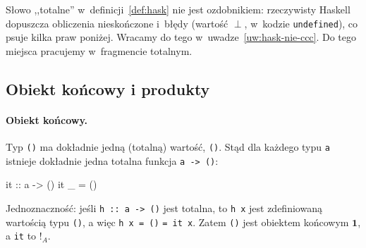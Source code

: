 Słowo ,,totalne'' w~definicji~\ref{def:hask} nie jest ozdobnikiem: rzeczywisty Haskell dopuszcza obliczenia nieskończone i~błędy (wartość $\perp$, w~kodzie \lstinline{undefined}), co psuje kilka praw poniżej. Wracamy do tego w~uwadze~\ref{uw:hask-nie-ccc}. Do tego miejsca pracujemy w~fragmencie totalnym.

\subsection*{Obiekt końcowy i produkty}

\paragraph{Obiekt końcowy.} Typ \lstinline{()} ma dokładnie jedną (totalną) wartość, \lstinline{()}. Stąd dla każdego typu \lstinline{a} istnieje dokładnie jedna totalna funkcja \lstinline{a -> ()}:
\begin{haskell}
it :: a -> ()
it _ = ()
\end{haskell}
Jednoznaczność: jeśli \lstinline{h :: a -> ()} jest totalna, to \lstinline{h x} jest zdefiniowaną wartością typu \lstinline{()}, a więc \lstinline{h x = ()} \lstinline{= it x}. Zatem \lstinline{()} jest obiektem końcowym $\mathbf{1}$, a \lstinline{it} to $!_A$.

